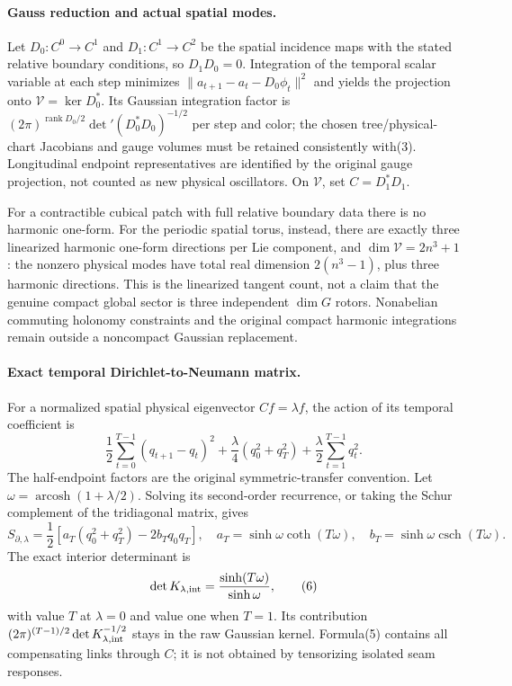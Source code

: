 \documentclass[11pt]{article}
\begin{document}
\paragraph{Gauss reduction and actual spatial modes.}
Let $D_0:C^0\to C^1$ and $D_1:C^1\to C^2$ be the spatial incidence maps with
the stated relative boundary conditions, so $D_1D_0=0$. Integration of the
temporal scalar variable at each step minimizes
$\|a_{t+1}-a_t-D_0\phi_t\|^2$ and yields the projection onto
$\mathcal V=\ker D_0^*$. Its Gaussian integration factor is
$(2\pi)^{\operatorname{rank}D_0/2}\det{}'(D_0^*D_0)^{-1/2}$ per step and
color; the chosen tree/physical-chart Jacobians and gauge volumes must be
retained consistently with(3). Longitudinal endpoint representatives are
identified by the original gauge projection, not counted as new physical
oscillators. On $\mathcal V$, set $C=D_1^*D_1$.

For a contractible cubical patch with full relative boundary data there is no
harmonic one-form. For the periodic spatial torus, instead, there are exactly
three linearized harmonic one-form directions per Lie component, and
$\dim\mathcal V=2n^3+1$: the nonzero physical modes have total real dimension
$2(n^3-1)$, plus three harmonic directions. This is the linearized tangent
count, not a claim that the genuine compact global sector is three independent
$\dim G$ rotors. Nonabelian commuting holonomy constraints and the original
compact harmonic integrations remain outside a noncompact Gaussian replacement.

\paragraph{Exact temporal Dirichlet-to-Neumann matrix.}
For a normalized spatial physical eigenvector $Cf=\lambda f$, the action of
its temporal coefficient is
\[
 \frac12\sum_{t=0}^{T-1}(q_{t+1}-q_t)^2
  +\frac\lambda4(q_0^2+q_T^2)+\frac\lambda2\sum_{t=1}^{T-1}q_t^2.        \tag{4}
\]
The half-endpoint factors are the original symmetric-transfer convention.
Let $\omega=\operatorname{arcosh}(1+\lambda/2)$. Solving its second-order
recurrence, or taking the Schur complement of the tridiagonal matrix, gives
\[
 S_{\partial,\lambda}=\frac12\left[
 a_T(q_0^2+q_T^2)-2b_Tq_0q_T\right],\quad
 a_T=\sinh\omega\coth(T\omega),\quad
 b_T=\sinh\omega\operatorname{csch}(T\omega).                           \tag{5}
\]
The exact interior determinant is
\[
 \det K_{\lambda,\rm int}=\frac{\sinh(T\omega)}{\sinh\omega},            \tag{6}
\]
with value $T$ at $\lambda=0$ and value one when $T=1$.
Its contribution $(2\pi)^{(T-1)/2}\det K_{\lambda,\rm int}^{-1/2}$ stays
in the raw Gaussian kernel. Formula(5) contains all compensating links through
$C$; it is not obtained by tensorizing isolated seam responses.
\end{document}
